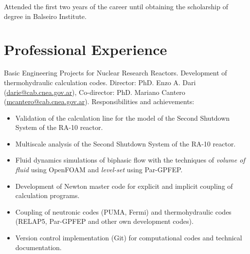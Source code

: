 \documentclass[11pt,a4paper,sans]{moderncv}        %
\begin{document}
{Attended the first two years of the career until obtaining the scholarship of degree in Balseiro Institute.}




\section{Professional Experience}

{Basic Engineering Projects for Nuclear Research Reactors.\newline{}%
Development of thermohydraulic calculation codes.\newline{}%
Director: PhD. Enzo A. Dari (\href{mailto:darie@cab.cnea.gov.ar}{darie@cab.cnea.gov.ar}), Co-director: PhD. Mariano Cantero (\href{mailto:mcantero@cab.cnea.gov.ar}{mcantero@cab.cnea.gov.ar}).\newline{}%
Responsibilities and achievements:%
\begin{itemize}%
\item Validation of the calculation line for the model of the Second Shutdown System of the RA-10 reactor.
\item Multiscale analysis of the Second Shutdown System of the RA-10 reactor.
\item Fluid dynamics simulations of biphasic flow with the techniques of \textit{volume of fluid} using OpenFOAM and \textit{level-set} using Par-GPFEP.
\item Development of Newton master code for explicit and implicit coupling of calculation programs.
\item Coupling of neutronic codes (PUMA, Fermi) and thermohydraulic codes (RELAP5, Par-GPFEP and other own development codes).
\item Version control implementation ({Git}) for computational codes and technical documentation.
\end{itemize}}
\end{document}
